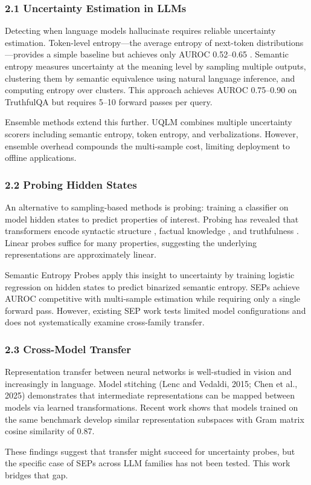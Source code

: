 
\subsubsection{2.1 Uncertainty Estimation in LLMs}

Detecting when language models hallucinate requires reliable uncertainty estimation. Token-level entropy---the average entropy of next-token distributions---provides a simple baseline but achieves only AUROC 0.52--0.65 \citep{Kadavath2022Language}. Semantic entropy \citep{Farquhar2024Detecting} measures uncertainty at the meaning level by sampling multiple outputs, clustering them by semantic equivalence using natural language inference, and computing entropy over clusters. This approach achieves AUROC 0.75--0.90 on TruthfulQA but requires 5--10 forward passes per query.

Ensemble methods extend this further. UQLM \citep{Vasilev2025UQLM} combines multiple uncertainty scorers including semantic entropy, token entropy, and verbalizations. However, ensemble overhead compounds the multi-sample cost, limiting deployment to offline applications.

\subsubsection{2.2 Probing Hidden States}

An alternative to sampling-based methods is probing: training a classifier on model hidden states to predict properties of interest. Probing has revealed that transformers encode syntactic structure \citep{Hewitt2019Structural}, factual knowledge \citep{Petroni2019Language}, and truthfulness \citep{Azaria2023Internal}. Linear probes suffice for many properties, suggesting the underlying representations are approximately linear.

Semantic Entropy Probes \citep{Kossen2024Semantic} apply this insight to uncertainty by training logistic regression on hidden states to predict binarized semantic entropy. SEPs achieve AUROC competitive with multi-sample estimation while requiring only a single forward pass. However, existing SEP work tests limited model configurations and does not systematically examine cross-family transfer.

\subsubsection{2.3 Cross-Model Transfer}

Representation transfer between neural networks is well-studied in vision \citep{Yosinski2014How} and increasingly in language. Model stitching (Lenc and Vedaldi, 2015; Chen et al., 2025) demonstrates that intermediate representations can be mapped between models via learned transformations. Recent work \citep{Kim2026Same} shows that models trained on the same benchmark develop similar representation subspaces with Gram matrix cosine similarity of 0.87.

These findings suggest that transfer might succeed for uncertainty probes, but the specific case of SEPs across LLM families has not been tested. This work bridges that gap.
